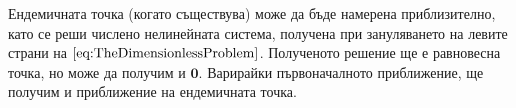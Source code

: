 
Ендемичната точка (когато съществува) може да бъде намерена приблизително, като се реши числено нелинейната система, получена при зануляването на левите страни на $\eqref{eq:TheDimensionlessProblem}$.
Полученото решение ще е равновесна точка, но може да получим и $\mathbf{0}$.
Варирайки първоначалното приближение, ще получим и приближение на ендемичната точка.
